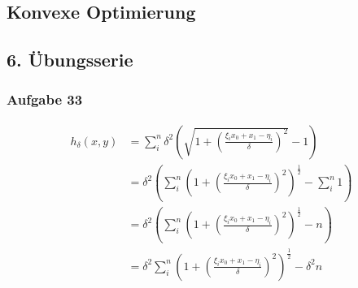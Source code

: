\documentclass[paper=A3, 
   paper=landscape,]{scrartcl}
\begin{document}
\begin{center}
	\section*{Konvexe Optimierung}
	\subsection*{6. Übungsserie}
\end{center}

\subsubsection*{Aufgabe 33}


\newcommand{\thefunc}{\xi_i^2 x_0^2 + 2 \xi_i x_0 x_1 - 2\xi_i x_0 \eta_i + x_1^2 -2 x_1 \eta_i   + \eta_i^2}
\newcommand{\z}{\xi_i x_0 + x_1 -\eta_i}


 \begin{align*}
 h_\delta(x,y) 	&= \sum\limits_i^n \delta^2 \left( \sqrt{1+\left( \frac { \xi_i x_0 + x_1 -\eta_i}{\delta} \right)^2} -1 \right)\\
 				&= \delta^2 \left( \sum\limits_i^n \left(1+\left( \frac { \xi_i x_0 + x_1 -\eta_i}{\delta} \right)^2\right)^\frac{1}{2} -\sum\limits_i^n 1 \right)\\
 				&= \delta^2 \left( \sum\limits_i^n \left(1+\left( \frac { \xi_i x_0 + x_1 -\eta_i}{\delta} \right)^2\right)^\frac{1}{2} -n \right)\\
 				&= \delta^2 \sum\limits_i^n \left(1+\left( \frac { \xi_i x_0 + x_1 -\eta_i}{\delta} \right)^2\right)^\frac{1}{2} - \delta^2 n \\
\end{align*}
\newcommand{\dfunca}{2\xi_i^2 x_0 + 2 \xi_i x_1 - 2\xi_i \eta_i -2 x_1 \eta_i}
\end{document}
